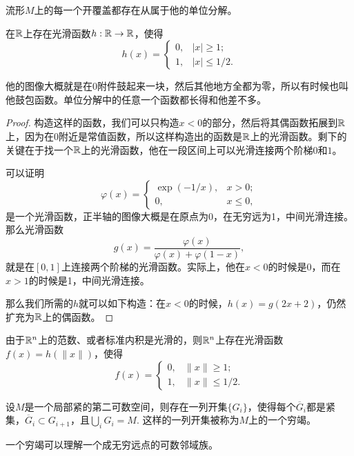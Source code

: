 \begin{lem}\label{POU}
流形$M$上的每一个开覆盖都存在从属于他的单位分解。
\end{lem}

\begin{pro}[$\rr$上的截断函数]
在$\rr$上存在光滑函数$h:\mathbb{R}\to\mathbb{R}$，使得
\[
	h(x)=
		\begin{cases}
		0,&|x|\geq 1;\\
		1,&|x|\leq 1/2.
		\end{cases}
\]
\end{pro}

他的图像大概就是在$0$附件鼓起来一块，然后其他地方全都为零，所以有时候也叫他鼓包函数。单位分解中的任意一个函数都长得和他差不多。

\begin{proof}
构造这样的函数，我们可以只构造$x<0$的部分，然后将其偶函数拓展到$\rr$上，因为在$0$附近是常值函数，所以这样构造出的函数是$\rr$上的光滑函数。剩下的关键在于找一个$\rr$上的光滑函数，他在一段区间上可以光滑连接两个阶梯$0$和$1$。

可以证明
\[
	\varphi(x)=
		\begin{cases}
			\exp(-1/x),&x> 0;\\
			0,&x\leq 0,
		\end{cases}
\]
是一个光滑函数，正半轴的图像大概是在原点为0，在无穷远为1，中间光滑连接。那么光滑函数
\[
	g(x)=\frac{\varphi(x)}{\varphi(x)+\varphi(1-x)},
\]
就是在$[0,1]$上连接两个阶梯的光滑函数。实际上，他在$x<0$的时候是0，而在$x>1$的时候是1，中间光滑连接。

那么我们所需的$h$就可以如下构造：在$x<0$的时候，$h(x)=g(2x+2)$，仍然扩充为$\rr$上的偶函数。
\end{proof}

\begin{para}[$\rr^n$上的截断函数]
由于$\rr^n$上的范数、或者标准内积是光滑的，则$\rr^n$上存在光滑函数$f(x)=h(\|x\|)$，使得
\[
	f(x)=
		\begin{cases}
		0,&\|x\|\geq 1;\\
		1,&\|x\|\leq 1/2.
		\end{cases}
\]
\end{para}

\begin{lem}\label{qiongjie}
设$M$是一个局部紧的第二可数空间，则存在一列开集$\{G_i\}$，使得每个$\overline{G}_i$都是紧集，$\overline{G}_i\subset G_{i+1}$，且$\bigcup_iG_i=M$. 这样的一列开集被称为$M$上的一个穷竭。
\end{lem}

一个穷竭可以理解一个成无穷远点的可数邻域族。


